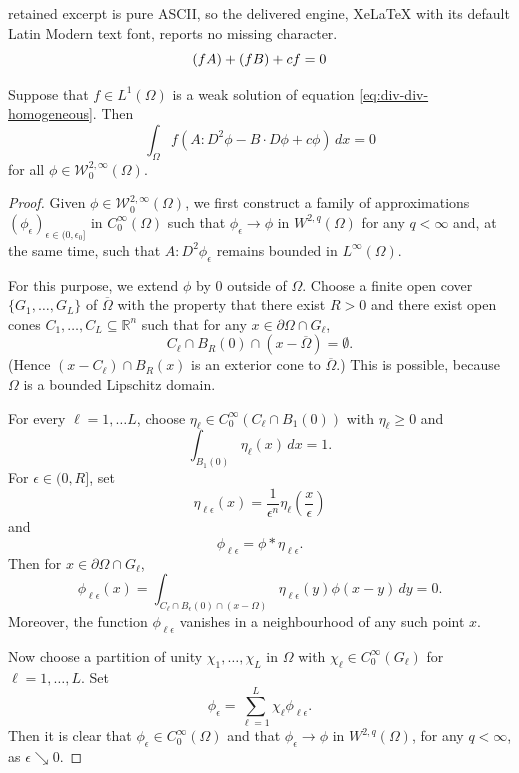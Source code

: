 \documentclass[10pt,a4paper]{amsart}
\let\div\relax\DeclareMathOperator{\div}{div}
\newcommand{\R}{\mathbb{R}}
\newcommand{\W}{\mathcal{W}}
\begin{document}
retained excerpt is pure ASCII, so the delivered engine, XeLaTeX with its default Latin Modern text font, reports no missing character.
\begin{equation} \label{eq:div-div-homogeneous}
\div \div (fA) + \div(fB) + cf = 0
\end{equation}

\begin{lemma} \label{lem:distributional-solutions}
Suppose that $f \in L^1(\Omega)$ is a weak solution of equation
\eqref{eq:div-div-homogeneous}. Then
\[
\int_\Omega f(A : D^2\phi - B \cdot D\phi + c\phi) \, dx = 0
\]
for all $\phi \in \W_0^{2, \infty}(\Omega)$.
\end{lemma}

\begin{proof}
Given $\phi \in \W_0^{2, \infty}(\Omega)$, we first construct a family of
approximations $(\phi_\epsilon)_{\epsilon \in (0, \epsilon_0]}$ in
$C_0^\infty(\Omega)$ such that $\phi_\epsilon \to \phi$ in $W^{2, q}(\Omega)$
for any $q < \infty$ and, at the same time, such that $A : D^2\phi_\epsilon$
remains bounded in $L^\infty(\Omega)$.

For this purpose, we extend $\phi$ by $0$ outside of $\Omega$.
Choose a finite open cover $\{G_1, \dotsc, G_L\}$ of
$\overline{\Omega}$ with the property that there exist $R > 0$ and
there exist open cones $C_1, \dotsc, C_L \subseteq \R^n$ such that
for any $x \in \partial \Omega \cap G_\ell$,
\[
C_\ell \cap B_R(0) \cap (x - \overline{\Omega}) = \emptyset.
\]
(Hence $(x - C_\ell) \cap B_R(x)$ is an exterior cone to $\overline{\Omega}$.)
This is possible, because $\Omega$ is a bounded Lipschitz domain.

For every $\ell = 1, \dotsc L$, choose $\eta_\ell \in C_0^\infty(C_\ell \cap B_1(0))$ with $\eta_\ell \ge 0$ and
\[
\int_{B_1(0)} \eta_\ell(x) \, dx = 1.
\]
For $\epsilon \in (0, R]$, set
\[
\eta_{\ell\epsilon}(x) = \frac{1}{\epsilon^n} \eta_\ell\left(\frac{x}{\epsilon}\right)
\]
and
\[
\phi_{\ell\epsilon} = \phi * \eta_{\ell\epsilon}.
\]
Then for $x \in \partial \Omega \cap G_\ell$,
\[
\phi_{\ell\epsilon}(x) = \int_{C_\ell \cap B_\epsilon(0) \cap (x - \Omega)} \eta_{\ell\epsilon}(y) \phi(x - y) \, dy = 0.
\]
Moreover, the function $\phi_{\ell\epsilon}$ vanishes in a neighbourhood of
any such point $x$.

Now choose a partition of unity $\chi_1, \dotsc, \chi_L$ in $\Omega$ with
$\chi_\ell \in C_0^\infty(G_\ell)$ for $\ell = 1, \dotsc, L$. Set
\[
\phi_\epsilon = \sum_{\ell = 1}^L \chi_\ell \phi_{\ell\epsilon}.
\]
Then it is clear that $\phi_\epsilon \in C_0^\infty(\Omega)$ and that
$\phi_\epsilon \to \phi$ in $W^{2, q}(\Omega)$, for any $q < \infty$, as
$\epsilon \searrow 0$.


\end{proof}
\end{document}
